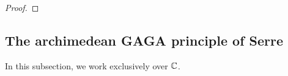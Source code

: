             \begin{theorem} \label{theorem: zariski_main_theorem}
                
            \end{theorem}
                \begin{proof}
                    
                \end{proof}

            \begin{theorem} \label{theorem: stein_factorisation}
                
            \end{theorem}

        \subsection{The archimedean GAGA principle of Serre}
            \begin{convention}
                In this subsection, we work exclusively over $\mathbb{C}$. 
            \end{convention}

